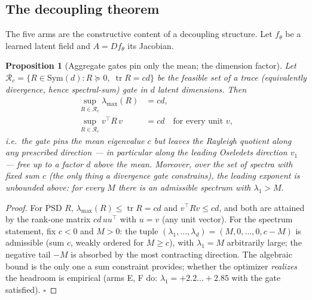 \documentclass[journal]{IEEEtran}
\newcommand{\tr}{\operatorname{tr}}
\newtheorem{proposition}{Proposition}
\begin{document}
\subsection{The decoupling theorem}
\label{sec:theorem}

The five arms are the constructive content of a decoupling structure.
Let $f_\theta$ be a learned latent field and $A=Df_\theta$ its Jacobian.

\begin{proposition}[Aggregate gates pin only the mean; the dimension factor]
\label{prop:trace}
Let $\mathcal{R}_c=\{R\in\mathrm{Sym}(d):R\succeq0,\;\tr R=cd\}$ be the
feasible set of a trace (equivalently divergence, hence spectral-sum)
gate in $d$ latent dimensions. Then
\begin{equation}
\begin{split}
  \sup_{R\in\mathcal{R}_c}\lambda_{\max}(R)&=cd,\\
  \sup_{R\in\mathcal{R}_c}v^\top R\,v&=cd\quad\text{for every unit }v,
\end{split}
\end{equation}
i.e.\ the gate pins the \emph{mean} eigenvalue $c$ but leaves the
Rayleigh quotient along any prescribed direction --- in particular along
the leading Oseledets direction $v_1$ --- free up to a factor $d$ above
the mean. Moreover, over the set of spectra with fixed sum $c$ (the
only thing a divergence gate constrains), the leading exponent is
\emph{unbounded above}: for every $M$ there is an admissible spectrum
with $\lambda_1>M$.
\end{proposition}

\begin{proof}
For PSD $R$, $\lambda_{\max}(R)\le\tr R=cd$ and $v^\top Rv\le cd$, and
both are attained by the rank-one matrix $cd\,uu^\top$ with $u=v$ (any
unit vector). For the spectrum statement, fix $c<0$ and $M>0$: the
tuple $(\lambda_1,\ldots,\lambda_d)=(M,0,\ldots,0,c-M)$ is admissible
(sum $c$, weakly ordered for $M\ge c$), with $\lambda_1=M$ arbitrarily
large; the negative tail $-M$ is absorbed by the most contracting
direction. The algebraic bound is the only one a sum constraint
provides; whether the optimizer \emph{realizes} the headroom is
empirical (arms E, F do: $\lambda_1=+2.2\ldots+2.85$ with the gate
satisfied). $\square$
\end{proof}
\end{document}
